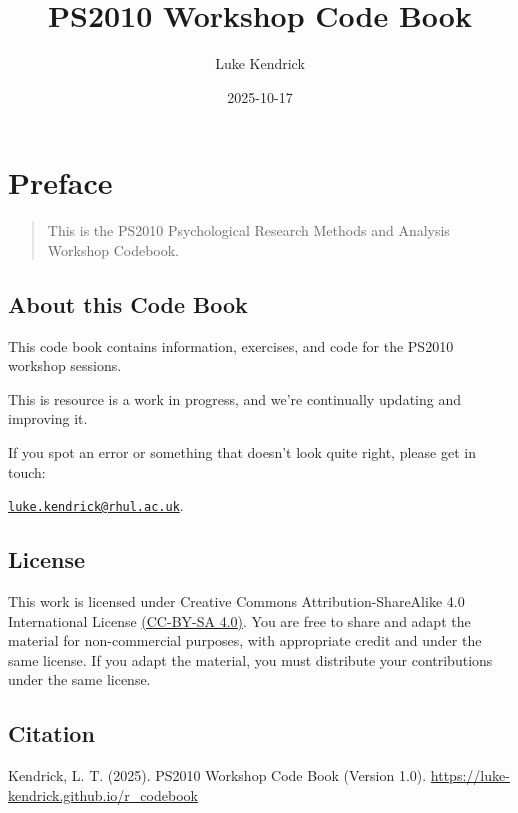 \documentclass[
]{book}
\title{PS2010 Workshop Code Book}
\author{Luke Kendrick}
\date{2025-10-17}
\let\oldsection\section
\renewcommand{\section}{\needspace{5\baselineskip}\oldsection}
\begin{document}
\maketitle

{
\setcounter{tocdepth}{1}
\tableofcontents
}
\chapter*{Preface}\label{preface}

\begin{quote}
This is the PS2010 Psychological Research Methods and Analysis Workshop Codebook.
\end{quote}

\section{About this Code Book}\label{about-this-code-book}

This code book contains information, exercises, and code for the PS2010 workshop sessions.

This is resource is a work in progress, and we're continually updating and improving it.

If you spot an error or something that doesn't look quite right, please get in touch:

\href{mailto:luke.kendrick@rhul.ac.uk}{\nolinkurl{luke.kendrick@rhul.ac.uk}}.

\section{\texorpdfstring{\textbf{License}}{License}}\label{license}

This work is licensed under Creative Commons Attribution-ShareAlike 4.0 International License \href{https://creativecommons.org/licenses/by-sa/4.0/}{(CC-BY-SA 4.0)}. You are free to share and adapt the material for non-commercial purposes, with appropriate credit and under the same license. If you adapt the material, you must distribute your contributions under the same license.

\section{\texorpdfstring{\textbf{Citation}}{Citation}}\label{citation}

Kendrick, L. T. (2025). PS2010 Workshop Code Book (Version 1.0). \url{https://luke-kendrick.github.io/r_codebook}
\end{document}
